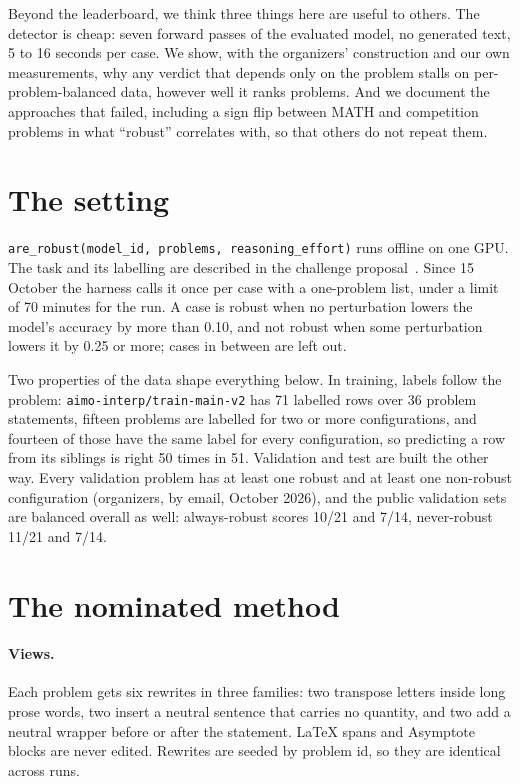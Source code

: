 \documentclass{article}
\begin{document}
Beyond the leaderboard, we think three things here are useful to others. The detector is cheap: seven forward passes of the evaluated model, no generated text, 5 to 16 seconds per case. We show, with the organizers' construction and our own measurements, why any verdict that depends only on the problem stalls on per-problem-balanced data, however well it ranks problems. And we document the approaches that failed, including a sign flip between MATH and competition problems in what ``robust'' correlates with, so that others do not repeat them.

\section{The setting}\label{the-setting}

\texttt{are\_robust(model\_id,\ problems,\ reasoning\_effort)} runs offline on one GPU. The task and its labelling are described in the challenge proposal~\citep{stefanik2026aimointerp}. Since 15 October the harness calls it once per case with a one-problem list, under a limit of 70 minutes for the run. A case is robust when no perturbation lowers the model's accuracy by more than 0.10, and not robust when some perturbation lowers it by 0.25 or more; cases in between are left out.

Two properties of the data shape everything below. In training, labels follow the problem: \texttt{aimo-interp/train-main-v2} has 71 labelled rows over 36 problem statements, fifteen problems are labelled for two or more configurations, and fourteen of those have the same label for every configuration, so predicting a row from its siblings is right 50 times in 51. Validation and test are built the other way. Every validation problem has at least one robust and at least one non-robust configuration (organizers, by email, October 2026), and the public validation sets are balanced overall as well: always-robust scores 10/21 and 7/14, never-robust 11/21 and 7/14.

\section{The nominated method}\label{the-nominated-method}

\paragraph{Views.} Each problem gets six rewrites in three families: two transpose letters inside long prose words, two insert a neutral sentence that carries no quantity, and two add a neutral wrapper before or after the statement. LaTeX spans and Asymptote blocks are never edited. Rewrites are seeded by problem id, so they are identical across runs.
\end{document}
